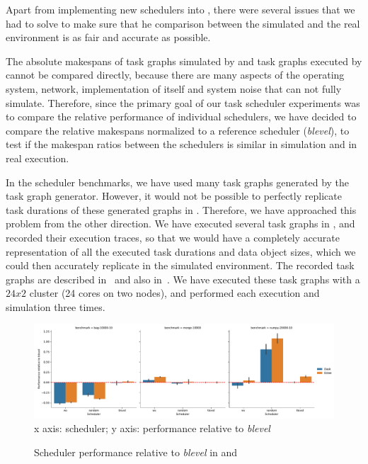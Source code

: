 Apart from implementing new schedulers into \dask{}, there were several issues that
we had to solve to make sure that he comparison between the simulated and the real environment is
as fair and accurate as possible.

The absolute makespans of task graphs simulated by \estee{} and task graphs executed
by \dask{} cannot be compared directly, because there are many aspects of the
operating system, network, implementation of \dask{} itself and system noise that
\estee{} can not fully simulate. Therefore, since the primary goal of our task
scheduler experiments was to compare the relative performance of individual schedulers, we have
decided to compare the relative makespans normalized to a reference scheduler
(\emph{blevel}), to test if the makespan ratios between the schedulers is similar in
simulation and in real execution.

In the scheduler benchmarks, we have used many task graphs generated by the \estee{}
task graph generator. However, it would not be possible to perfectly replicate task durations of
these generated graphs in \dask{}. Therefore, we have approached this problem from
the other direction. We have executed several task graphs in \dask{}, and recorded
their execution traces, so that we would have a completely accurate representation of all the
executed task durations and data object sizes, which we could then accurately replicate in the
simulated \estee{} environment. The recorded task graphs are described
in~ and also in~\cite{rsds}. We have executed these task graphs
with a $24x2$ cluster (24 cores on two nodes), and performed each execution and
simulation three times.

\begin{figure}
	\centering
	\includegraphics[width=\textwidth]{imgs/estee/charts/estee-validation}\\
	{\small x axis: scheduler; y axis: performance relative to \emph{blevel}}
	\caption{Scheduler performance relative to \emph{blevel} in \dask{} and \estee}
	\label{fig:estee-validation}
\end{figure}

